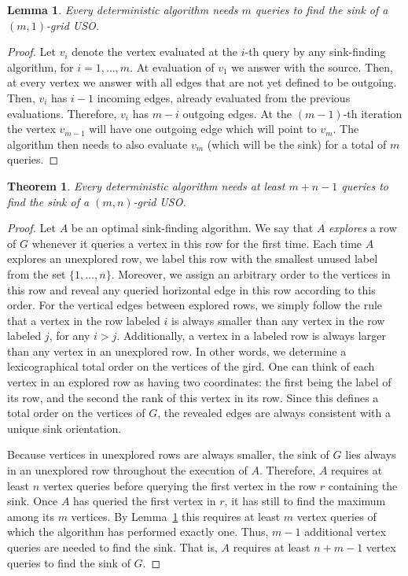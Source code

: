 \documentclass[a4paper,10pt]{article}
\newtheorem{lemma}{Lemma}
\newtheorem{theorem}{Theorem}
\begin{document}
\begin{lemma}\label{lem:kx1}
Every deterministic algorithm needs $m$ queries to find the sink of a $(m,1)$-grid USO. 
\end{lemma}
\begin{proof}
Let $v_i$ denote the vertex evaluated at the $i$-th query by any sink-finding algorithm, for $i=1,\ldots, m$. At evaluation of $v_1$ we answer with the source. Then, at every vertex 
we answer with all edges that are not yet defined to be outgoing. Then, $v_i$ has $i-1$ incoming edges, already evaluated from the previous evaluations. 
Therefore, $v_i$ has $m-i$ outgoing edges. At the $(m-1)$-th iteration the vertex $v_{m-1}$ will have one outgoing edge which will point to $v_m$.
The algorithm then needs to also evaluate $v_m$ (which will be the sink) for a total of $m$ queries. 
\end{proof}

\begin{theorem} \label{thm:lowerbound}
Every deterministic algorithm needs at least $m+n-1$ queries to find the sink of a $(m,n)$-grid USO. 
\end{theorem}
\begin{proof}
Let $A$ be an optimal sink-finding algorithm. We say that $A$ \emph{explores} a row of $G$ whenever it queries a vertex in this row for the first time.
Each time $A$ explores an unexplored row, we label this row with the smallest unused label from the set $\{1, \ldots, n\}$. Moreover, we assign an arbitrary order to the vertices in this row and reveal any queried horizontal edge in this row according to this order. For the vertical edges between explored rows, we simply follow the rule that a vertex in the row labeled $i$ is always smaller than any vertex in the row labeled $j$, for any $i > j$. Additionally, a vertex in a labeled row is always larger than any vertex in an unexplored row. In other words, we determine a lexicographical total order on the vertices of the gird. One can think of each vertex in an explored row as having two coordinates: the first being the label of its row, and the second the rank of this vertex in its row.
Since this defines a total order on the vertices of $G$, the revealed edges are always consistent with a unique sink orientation.

Because vertices in unexplored rows are always smaller, the sink of $G$ lies always in an unexplored row throughout the execution of $A$. Therefore, $A$ requires at least $n$ vertex queries before querying the first vertex in the row $r$ containing the sink. Once $A$ has queried the first vertex in $r$, it has still to find the maximum among its $m$ vertices. 
By Lemma~\ref{lem:kx1} this requires at least $m$ vertex queries of which the algorithm has performed exactly one. Thus, $m-1$ additional vertex queries are needed to find the sink. That is, $A$ requires at least $n+m-1$ vertex queries to find the sink of $G$. 
\end{proof}



\end{document}
